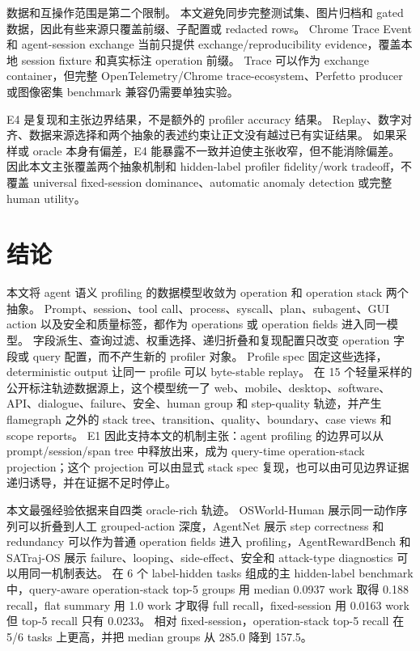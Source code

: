 \documentclass[10pt,twocolumn]{ctexart}
\begin{document}
数据和互操作范围是第二个限制。
本文避免同步完整测试集、图片归档和 gated 数据，因此有些来源只覆盖前缀、子配置或 redacted rows。
Chrome Trace Event 和 agent-session exchange 当前只提供 exchange/reproducibility evidence，覆盖本地 session fixture 和真实标注 operation 前缀。
Trace 可以作为 exchange container，但完整 OpenTelemetry/Chrome trace-ecosystem、Perfetto producer 或图像密集 benchmark 兼容仍需要单独实验。

E4 是复现和主张边界结果，不是额外的 profiler accuracy 结果。
Replay、数字对齐、数据来源选择和两个抽象的表述约束让正文没有越过已有实证结果。
如果采样或 oracle 本身有偏差，E4 能暴露不一致并迫使主张收窄，但不能消除偏差。
因此本文主张覆盖两个抽象机制和 hidden-label profiler fidelity/work tradeoff，不覆盖 universal fixed-session dominance、automatic anomaly detection 或完整 human utility。

\section{结论}

本文将 agent 语义 profiling 的数据模型收敛为 operation 和 operation stack 两个抽象。
Prompt、session、tool call、process、syscall、plan、subagent、GUI action 以及安全和质量标签，都作为 operations 或 operation fields 进入同一模型。
字段派生、查询过滤、权重选择、递归折叠和复现配置只改变 operation 字段或 query 配置，而不产生新的 profiler 对象。
Profile spec 固定这些选择，deterministic output 让同一 profile 可以 byte-stable replay。
在 15 个轻量采样的公开标注轨迹数据源上，这个模型统一了 web、mobile、desktop、software、API、dialogue、failure、安全、human group 和 step-quality 轨迹，并产生 flamegraph 之外的 stack tree、transition、quality、boundary、case views 和 scope reports。
E1 因此支持本文的机制主张：agent profiling 的边界可以从 prompt/session/span tree 中释放出来，成为 query-time operation-stack projection；这个 projection 可以由显式 stack spec 复现，也可以由可见边界证据递归诱导，并在证据不足时停止。

本文最强经验依据来自四类 oracle-rich 轨迹。
OSWorld-Human 展示同一动作序列可以折叠到人工 grouped-action 深度，AgentNet 展示 step correctness 和 redundancy 可以作为普通 operation fields 进入 profiling，AgentRewardBench 和 SATraj-OS 展示 failure、looping、side-effect、安全和 attack-type diagnostics 可以用同一机制表达。
在 6 个 label-hidden tasks 组成的主 hidden-label benchmark 中，query-aware operation-stack top-5 groups 用 median 0.0937 work 取得 0.188 recall，flat summary 用 1.0 work 才取得 full recall，fixed-session 用 0.0163 work 但 top-5 recall 只有 0.0233。
相对 fixed-session，operation-stack top-5 recall 在 5/6 tasks 上更高，并把 median groups 从 285.0 降到 157.5。
\end{document}
